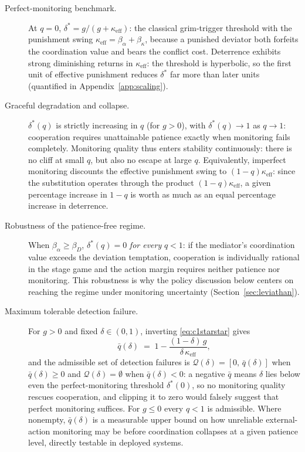 \documentclass[manuscript,screen,review]{jair}
\begin{document}
\begin{description}
\item[Perfect-monitoring benchmark.] At $q = 0$, $\delta^* = g/(g + \kappa_{\mathrm{eff}})$: the classical grim-trigger threshold \cite{friedman.1971} with the punishment swing $\kappa_{\mathrm{eff}} = \beta_\alpha + \beta_\kappa$, because a punished deviator both forfeits the coordination value and bears the conflict cost. Deterrence exhibits strong diminishing returns in $\kappa_{\mathrm{eff}}$: the threshold is hyperbolic, so the first unit of effective punishment reduces $\delta^*$ far more than later units (quantified in Appendix~\ref{app:scaling}).
\item[Graceful degradation and collapse.] $\delta^*(q)$ is strictly increasing in $q$ (for $g>0$), with $\delta^*(q) \to 1$ as $q \to 1$: cooperation requires unattainable patience exactly when monitoring fails completely. Monitoring quality thus enters stability continuously: there is no cliff at small $q$, but also no escape at large $q$. Equivalently, imperfect monitoring discounts the effective punishment swing to $(1-q)\kappa_{\mathrm{eff}}$: since the substitution operates through the product $(1-q)\kappa_{\mathrm{eff}}$, a given percentage increase in $1-q$ is worth as much as an equal percentage increase in deterrence.
\item[Robustness of the patience-free regime.] When $\beta_\alpha \geq \beta_D$, $\delta^*(q) = 0$ \emph{for every} $q < 1$: if the mediator's coordination value exceeds the deviation temptation, cooperation is individually rational in the stage game and the action margin requires neither patience nor monitoring. This robustness is why the policy discussion below centers on reaching the regime under monitoring uncertainty (Section~\ref{sec:leviathan}).
\item[Maximum tolerable detection failure.] For $g > 0$ and fixed $\delta \in (0,1)$, inverting \eqref{eq:c1starstar} gives
\begin{equation}
\bar q(\delta) \;=\; 1 - \frac{(1-\delta)\,g}{\delta\,\kappa_{\mathrm{eff}}} ,
\label{eq:qbar}
\end{equation}
and the admissible set of detection failures is $\mathcal{Q}(\delta) = [0,\, \bar q(\delta)]$ when $\bar q(\delta) \geq 0$ and $\mathcal{Q}(\delta) = \emptyset$ when $\bar q(\delta) < 0$: a negative $\bar q$ means $\delta$ lies below even the perfect-monitoring threshold $\delta^*(0)$, so no monitoring quality rescues cooperation, and clipping it to zero would falsely suggest that perfect monitoring suffices. For $g \leq 0$ every $q < 1$ is admissible. Where nonempty, $\bar q(\delta)$ is a measurable upper bound on how unreliable external-action monitoring may be before coordination collapses at a given patience level, directly testable in deployed systems.
\end{description}
\end{document}
